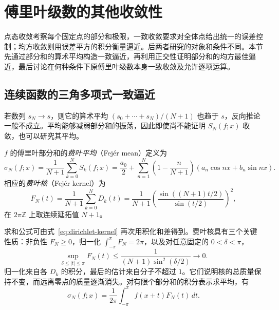 \section{傅里叶级数的其他收敛性}
\label{sec:other-convergence-properties-of-fourier-series}

点态收敛考察每个固定点的部分和极限，一致收敛要求对全体点给出统一的误差控制；均方收敛则用误差平方的积分衡量逼近。后两者研究的对象和条件不同。本节先通过部分和的算术平均构造一致逼近，再利用正交性证明部分和的均方最佳逼近，最后讨论在何种条件下原傅里叶级数本身一致收敛及允许逐项运算。

\subsection{连续函数的三角多项式一致逼近}
\label{subsec:uniform-trigonometric-approximation}

若数列 $s_N\to s$，则它的算术平均 $(s_0+\cdots+s_N)/(N+1)$ 也趋于 $s$，反向推论一般不成立。平均能够减弱部分和的振荡，因此即使尚不能证明 $S_N(f;x)$ 收敛，也可以研究其平均。

\begin{definition}
\label{def:fejer-means-and-kernel}
$f$ 的傅里叶部分和的\emph{费叶平均}（Fej\'er mean）定义为
\begin{equation}
    \sigma_N(f;x)=\frac1{N+1}\sum_{k=0}^NS_k(f;x)
       =\frac{a_0}{2}+\sum_{n=1}^N
           \left(1-\frac n{N+1}\right)
                        (a_n\cos nx+b_n\sin nx).
    \label{eq:fejer-means}
\end{equation}
相应的\emph{费叶核}（Fej\'er kernel）为
\begin{equation}
    F_N(t)=\frac1{N+1}\sum_{k=0}^ND_k(t)
       =\frac1{N+1}
             \left(\frac{\sin((N+1)t/2)}{\sin(t/2)}\right)^2,
    \label{eq:fejer-kernel}
\end{equation}
在 $2\pi\mathbb Z$ 上取连续延拓值 $N+1$。
\end{definition}

求和公式可由式~\eqref{eq:dirichlet-kernel} 再次用积化和差得到。费叶核具有三个关键性质：非负性 $F_N\geq0$，归一化 $\int_{-\pi}^{\pi}F_N=2\pi$，以及对任意固定的 $0<\delta<\pi$，
\begin{equation}
    \sup_{\delta\leq|t|\leq\pi}F_N(t)
       \leq\frac1{(N+1)\sin^2(\delta/2)}\longrightarrow0.
    \label{eq:fejer-kernel-concentration}
\end{equation}
归一化来自各 $D_k$ 的积分，最后的估计来自分子不超过 $1$。它们说明核的总质量保持不变，而远离零点的质量逐渐消失。对有限个部分和的积分表示求平均，有
\begin{equation}
    \sigma_N(f;x)=\frac1{2\pi}\int_{-\pi}^{\pi}
                                     f(x+t)F_N(t)\,dt.
    \label{eq:fejer-convolution}
\end{equation}

